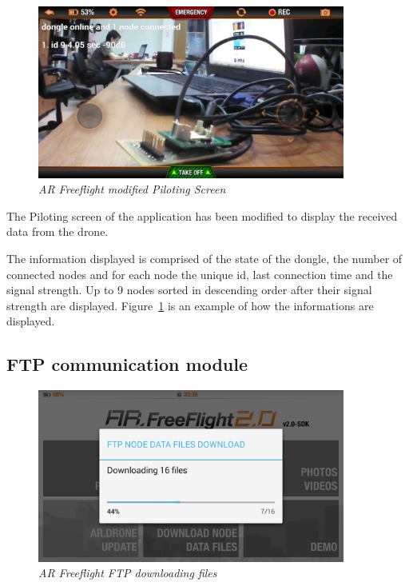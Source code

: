 \begin{figure}[ht]
\begin{center}
\includegraphics[width=0.9\textwidth]{img/android_info.png}
\end{center}
\caption{\small \itshape{AR Freeflight modified Piloting Screen}}
  \label{fig:pilot}
\end{figure}

The Piloting screen of the application has been modified to display the received data from the drone.

The information displayed is comprised of the state of the dongle, the number of connected nodes and for each node the unique id, last connection time and the signal strength. Up to 9 nodes sorted in descending order after their signal strength are displayed. Figure~\ref{fig:pilot} is an example of how the informations are displayed.

\subsection{FTP communication module}

\begin{figure}[ht]
\begin{center}
\includegraphics[width=0.9\textwidth]{img/android_ftp.png}
\end{center}
\caption{\small \itshape{AR Freeflight FTP downloading files}}
  \label{fig:ftp}
\end{figure}

